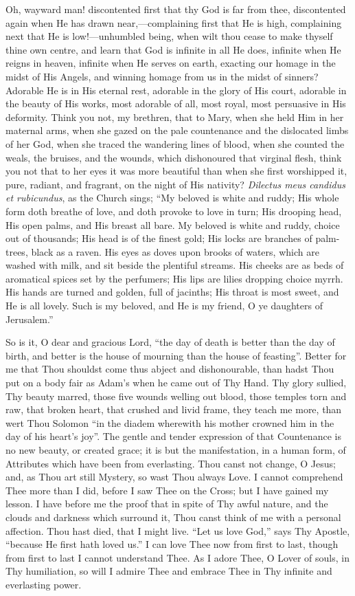 Oh, wayward man! discontented first that thy God is far from thee,
discontented again when He has drawn near,—complaining first that He
is high, complaining next that He is low!—unhumbled being, when wilt
thou cease to make thyself thine own centre, and learn that God is
infinite in all He does, infinite when He reigns in heaven, infinite
when He serves on earth, exacting our homage in the midst of His
Angels, and winning homage from us in the midst of sinners? Adorable
He is in His eternal rest, adorable in the glory of His court,
adorable in the beauty of His works, most adorable of all, most royal,
most persuasive in His deformity. Think you not, my brethren, that to
Mary, when she held Him in her maternal arms, when she gazed on the
pale countenance and the dislocated limbs of her God, when she traced
the wandering lines of blood, when she counted the weals, the bruises,
and the wounds, which dishonoured that virginal flesh, think you not
that to her eyes it was more beautiful than when she first worshipped
it, pure, radiant, and fragrant, on the night of His nativity? \emph{Dilectus
meus candidus et rubicundus}, as the Church sings; ``My beloved
is white and ruddy; His whole form doth breathe of love, and doth
provoke to love in turn; His drooping head, His open palms, and His
breast all bare. My beloved is white and ruddy, choice out of
thousands; His head is of the finest gold; His locks are branches of
palm-trees, black as a raven. His eyes as doves upon brooks of waters,
which are washed with milk, and sit beside the plentiful streams. His
cheeks are as beds of aromatical spices set by the perfumers; His lips
are lilies dropping choice myrrh. His hands are turned and golden,
full of jacinths; His throat is most sweet, and He is all lovely. Such
is my beloved, and He is my friend, O ye daughters of Jerusalem.''

So is it, O dear and gracious Lord, ``the day of death is
better than the day of birth, and better is the house of mourning than
the house of feasting''. Better for me that Thou shouldst come
thus abject and dishonourable, than hadst Thou put on a body fair as
Adam's when he came out of Thy Hand. Thy glory sullied, Thy beauty
marred, those five wounds welling out blood, those temples torn and
raw, that broken heart, that crushed and livid frame, they teach me
more, than wert Thou Solomon ``in the diadem wherewith his mother
crowned him in the day of his heart's joy''. The gentle and tender
expression of that Countenance is no new beauty, or created grace; it
is but the manifestation, in a human form, of Attributes which have
been from everlasting. Thou canst not change, O Jesus; and, as Thou
art still Mystery, so wast Thou always Love. I cannot comprehend Thee
more than I did, before I saw Thee on the Cross; but I have gained my
lesson. I have before me the proof that in spite of Thy awful nature,
and the clouds and darkness which surround it, Thou canst think of me
with a personal affection. Thou hast died, that I might live.
``Let us love God,'' says Thy Apostle, ``because He first
hath loved us.'' I can love Thee now from first to last, though
from first to last I cannot understand Thee. As I adore Thee, O Lover
of souls, in Thy humiliation, so will I admire Thee and embrace Thee
in Thy infinite and everlasting power.

